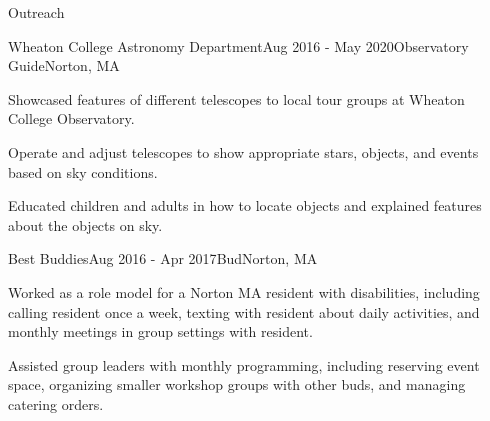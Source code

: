 \documentclass{resume} %
\begin{document}
\begin{rSection}{Outreach}

\begin{rSubsection}{Wheaton College Astronomy Department}{Aug 2016 - May 2020}{Observatory Guide}{Norton, MA}
\item Showcased features of different telescopes to local tour groups at Wheaton College Observatory.
\item Operate and adjust telescopes to show appropriate stars, objects, and events based on sky conditions.
\item Educated children and adults in how to locate objects and explained features about the objects on sky.

\end{rSubsection}

\begin{rSubsection}{Best Buddies}{Aug 2016 - Apr 2017}{Bud}{Norton, MA}
    \item Worked as a role model for a Norton MA resident with disabilities, including calling resident once a week, texting with resident about daily activities, and monthly meetings in group settings with resident.
    \item Assisted group leaders with monthly programming, including reserving event space, organizing smaller workshop groups with other buds, and managing catering orders.
    
\end{rSubsection}

\end{rSection}
\end{document}
